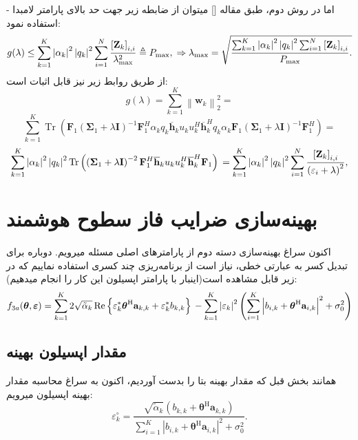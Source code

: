 - اما در روش دوم، طبق مقاله [] میتوان از ضابطه زیر جهت حد بالای پارامتر لامبدا استفاده نمود:
\[
	g(\lambda) \leq \sum_{k=1}^{K}\left|\alpha_{k}\right|^{2}\left|q_{k}\right|^{2} \sum_{i=1}^{N} \frac{\left[\mathbf{Z}_{k}\right]_{i, i}}{\lambda_{\max }^{2}} \triangleq P_{\max }, \\
	\Rightarrow \lambda_{\max }=\sqrt{\frac{\sum_{k=1}^{K}\left|\alpha_{k}\right|^{2}\left|q_{k}\right|^{2} \sum_{i=1}^{N}\left[\mathbf{Z}_{k}\right]_{i, i}}{P_{\max }} .}
\]
از طریق روابط زیر نیز قابل اثبات است:
\[
	g(\lambda)  =\sum_{k=1}^{K}\left\|\mathbf{w}_{k}\right\|_{2}^{2}=
\]
\[
\sum_{k=1}^{K} \operatorname{Tr}\left(\mathbf{F}_{1}\left(\boldsymbol{\Sigma}_{1}+\lambda \mathbf{I}\right)^{-1} \mathbf{F}_{1}^{H} \alpha_{k} q_{k} \overline{\mathbf{h}}_{k} u_{k} u_{k}^{H} \overline{\mathbf{h}}_{k}^{H} q_{k} \alpha_{k} \mathbf{F}_{1}\left(\boldsymbol{\Sigma}_{1}+\lambda \mathbf{I}\right)^{-1} \mathbf{F}_{1}^{H}\right)=
\]
\[
	 \sum_{k=1}^{K}\left|\alpha_{k}\right|^{2}\left|q_{k}\right|^{2} \operatorname{Tr}\left(\left(\boldsymbol{\Sigma}_{1}+\lambda \mathbf{I}\right)^{-2} \mathbf{F}_{1}^{H} \overline{\mathbf{h}}_{k} u_{k} u_{k}^{H} \overline{\mathbf{h}}_{k}^{H} \mathbf{F}_{1}\right) \\
	 =\sum_{k=1}^{K}\left|\alpha_{k}\right|^{2}\left|q_{k}\right|^{2} \sum_{i=1}^{N} \frac{\left[\mathbf{Z}_{k}\right]_{i, i}}{\left(\varepsilon_{i}+\lambda\right)^{2}},
\]
\section{بهینه‌سازی ضرایب فاز سطوح هوشمند}
اکنون سراغ بهینه‌سازی دسته دوم از پارامترهای اصلی مسئله میرویم. دوباره برای تبدیل کسر به عبارتی خطی، نیاز است از برنامه‌ریزی چند کسری استفاده نماییم که در زیر قابل مشاهده است(اینبار با پارامتر اپسیلون این کار را انجام میدهیم):
\[
	f_{3 a}(\boldsymbol{\theta}, \boldsymbol{\varepsilon})=  \sum_{k=1}^{K} 2 \sqrt{\tilde{\alpha}_{k}} \operatorname{Re}\left\{\varepsilon_{k}^{*} \boldsymbol{\theta}^{\mathrm{H}} \mathbf{a}_{k, k}+\varepsilon_{k}^{*} b_{k, k}\right\} \\
	 -\sum_{k=1}^{K}\left|\varepsilon_{k}\right|^{2}\left(\sum_{i=1}^{K}\left|b_{i, k}+\boldsymbol{\theta}^{\mathrm{H}} \mathbf{a}_{i, k}\right|^{2}+\sigma_{0}^{2}\right)
\]

\subsection{مقدار اپسیلون بهینه}
همانند بخش قبل که مقدار بهینه بتا را بدست آوردیم، اکنون به سراغ محاسبه مقدار بهینه اپسیلون میرویم:\
\[
\varepsilon_{k}^{\circ}=\frac{\sqrt{\tilde{\alpha}_{k}}\left(b_{k, k}+\boldsymbol{\theta}^{\mathrm{H}} \mathbf{a}_{k, k}\right)}{\sum_{i=1}^{K}\left|b_{i, k}+\boldsymbol{\theta}^{\mathrm{H}} \mathbf{a}_{i, k}\right|^{2}+\sigma_{0}^{2}} .
\]

